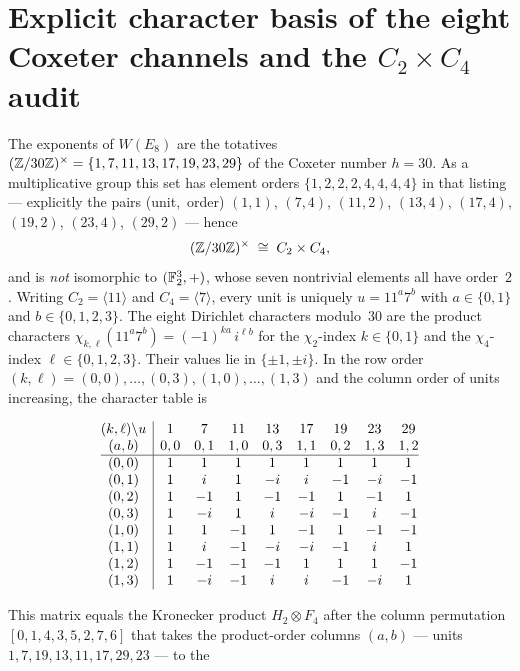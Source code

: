\section{Explicit character basis of the eight Coxeter channels
and the \texorpdfstring{$C_2\times C_4$}{C2 x C4} audit}\label{sec:coxeter-chars}

The exponents of $W(E_8)$ are the totatives
$(\mathbb Z/30\mathbb Z)^{\times}=\{1,7,11,13,17,19,23,29\}$ of the Coxeter number
$h=30$.  As a multiplicative group this set has element orders
$\{1,2,2,2,4,4,4,4\}$ in that listing --- explicitly the pairs
(unit,~order)
$(1,1)$, $(7,4)$, $(11,2)$, $(13,4)$, $(17,4)$, $(19,2)$, $(23,4)$,
$(29,2)$ --- hence
\[
(\mathbb Z/30\mathbb Z)^{\times}\;\cong\;C_2\times C_4,
\]
and is \emph{not} isomorphic to $(\mathbb F_2^3,+)$, whose seven nontrivial
elements all have order~$2$.  Writing $C_2=\langle 11\rangle$ and
$C_4=\langle 7\rangle$, every unit is uniquely $u=11^a7^b$ with
$a\in\{0,1\}$ and $b\in\{0,1,2,3\}$.  The eight Dirichlet characters
modulo~$30$ are the product characters
$\chi_{k,\ell}(11^a7^b)=(-1)^{ka}\,i^{\ell b}$ for the
$\chi_2$-index $k\in\{0,1\}$ and the $\chi_4$-index
$\ell\in\{0,1,2,3\}$.  Their values lie in $\{\pm1,\pm i\}$.  In the
row order $(k,\ell)=(0,0),\dots,(0,3),(1,0),\dots,(1,3)$ and the
column order of units increasing, the character table is
\begin{center}
\small
\setlength{\arraycolsep}{3.6pt}
\[
\begin{array}{@{}c|cccccccc@{}}
(k,\ell)\backslash u & 1 & 7 & 11 & 13 & 17 & 19 & 23 & 29 \\
(a,b) & 0,0 & 0,1 & 1,0 & 0,3 & 1,1 & 0,2 & 1,3 & 1,2 \\
\hline
(0,0) & 1 & 1 & 1 & 1 & 1 & 1 & 1 & 1 \\
(0,1) & 1 & i & 1 & -i & i & -1 & -i & -1 \\
(0,2) & 1 & -1 & 1 & -1 & -1 & 1 & -1 & 1 \\
(0,3) & 1 & -i & 1 & i & -i & -1 & i & -1 \\
(1,0) & 1 & 1 & -1 & 1 & -1 & 1 & -1 & -1 \\
(1,1) & 1 & i & -1 & -i & -i & -1 & i & 1 \\
(1,2) & 1 & -1 & -1 & -1 & 1 & 1 & 1 & -1 \\
(1,3) & 1 & -i & -1 & i & i & -1 & -i & 1
\end{array}
\]
\end{center}
This matrix equals the Kronecker product $H_2\otimes F_4$ after the
column permutation $[0,1,4,3,5,2,7,6]$ that takes the product-order
columns $(a,b)$ --- units $1,7,19,13,11,17,29,23$ --- to the
